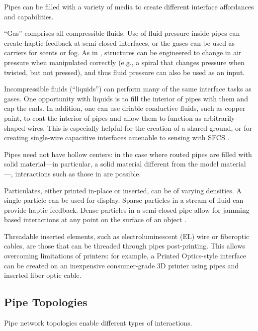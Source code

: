 Pipes can be filled with a variety of media to create different interface affordances and capabilities.

``Gas'' comprises all compressible fluids.  Use of fluid pressure inside pipes can create haptic feedback at semi-closed interfaces, or the gases can be used as carriers for scents or fog.  As in \cite{Slyper-pressure}, structures can be engineered to change in air pressure when manipulated correctly (e.g., a spiral that changes pressure when twisted, but not pressed), and thus fluid pressure can also be used as an input.  

Incompressible fluids (``liquids'') can perform many of the same interface tasks as gases.  One opportunity with liquids is to fill the interior of pipes with them and cap the ends.  In addition, one can use driable conductive fluids, such as copper paint, to coat the interior of pipes and allow them to function as arbitrarily-shaped wires.  This is especially helpful for the creation of a shared ground, or for creating single-wire capacitive interfaces amenable to sensing with SFCS \cite{Sato-touche}.

Pipes need not have hollow centers: in the case where routed pipes are filled with solid material---in particular, a solid material different from the model material---, interactions such as those in \cite{Willis-printedoptics} are possible.

Particulates, either printed in-place or inserted, can be of varying densities.  A single particle can be used for display.  Sparse particles in a stream of fluid can provide haptic feedback.  Dense particles in a semi-closed pipe allow for jamming-based interactions at any point on the surface of an object \cite{Follmer-jamming}.

Threadable inserted elements, such as electroluminescent (EL) wire or fiberoptic cables, are those that can be threaded through pipes post-printing.  This allows overcoming limitations of printers: for example, a Printed Optics-style interface can be created on an inexpensive consumer-grade 3D printer using pipes and inserted fiber optic cable.

\subsection{Pipe Topologies}

Pipe network topologies enable different types of interactions.

